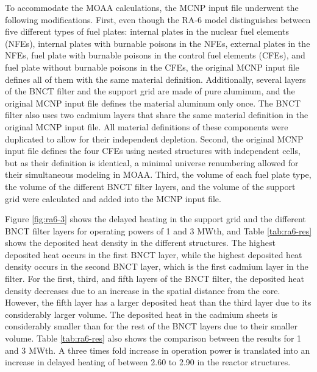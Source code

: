 To accommodate the MOAA calculations, the MCNP input file underwent the following modifications.
First, even though the RA-6 model distinguishes between five different types of fuel plates: internal plates in the nuclear fuel elements (NFEs), internal plates with burnable poisons in the NFEs, external plates in the NFEs, fuel plate with burnable poisons in the control fuel elements (CFEs), and fuel plate without burnable poisons in the CFEs, the original MCNP input file defines all of them with the same material definition.
Additionally, several layers of the BNCT filter and the support grid are made of pure aluminum, and the original MCNP input file defines the material aluminum only once.
The BNCT filter also uses two cadmium layers that share the same material definition in the original MCNP input file.
All material definitions of these components were duplicated to allow for their independent depletion.
Second, the original MCNP input file defines the four CFEs using nested structures with independent cells, but as their definition is identical, a minimal universe renumbering allowed for their simultaneous modeling in MOAA.
Third, the volume of each fuel plate type, the volume of the different BNCT filter layers, and the volume of the support grid were calculated and added into the MCNP input file.

Figure \ref{fig:ra6-3} shows the delayed heating in the support grid and the different BNCT filter layers for operating powers of 1 and 3 MWth, and Table \ref{tab:ra6-res} shows the deposited heat density in the different structures.
The highest deposited heat occurs in the first BNCT layer, while the highest deposited heat density occurs in the second BNCT layer, which is the first cadmium layer in the filter.
For the first, third, and fifth layers of the BNCT filter, the deposited heat density decreases due to an increase in the spatial distance from the core.
However, the fifth layer has a larger deposited heat than the third layer due to its considerably larger volume.
The deposited heat in the cadmium sheets is considerably smaller than for the rest of the BNCT layers due to their smaller volume.
Table \ref{tab:ra6-res} also shows the comparison between the results for 1 and 3 MWth.
A three times fold increase in operation power is translated into an increase in delayed heating of between 2.60 to 2.90 in the reactor structures.

